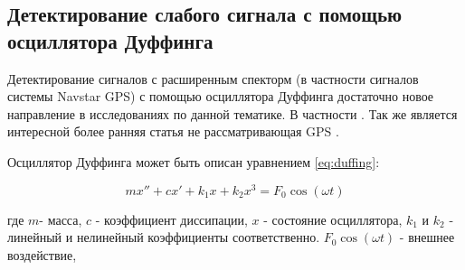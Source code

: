 \subsection{Детектирование слабого сигнала с помощью осциллятора Дуффинга}
\label{ssec:duffing}

Детектирование сигналов с расширенным спекторм (в частности сигналов системы Navstar GPS) с помощью осциллятора Дуффинга
достаточно новое направление в исследованиях по данной тематике. В частности
\cite{chaos_chen, chaos_cambridge, chaos_huang, chaos_song}. Так же является интересной более ранняя статья не рассматривающая GPS
\cite{chaos_wang}.

Осциллятор Дуффинга может быть описан уравнением \ref{eq:duffing}:

\begin{center}
\begin{equation}
	\label{eq:duffing}
	mx'' + cx' + k_{1}x + k_{2}x^3 = F_{0}\cos(\omega{t})
\end{equation}
\end{center}

где
$m$- масса,
$c$ - коэффициент диссипации,
$x$ - состояние осциллятора,
$k_1$ и $k_2$ - линейный и нелинейный коэффициенты соответственно.
$F_{0}\cos(\omega{t})$ - внешнее воздействие,

\newpage
